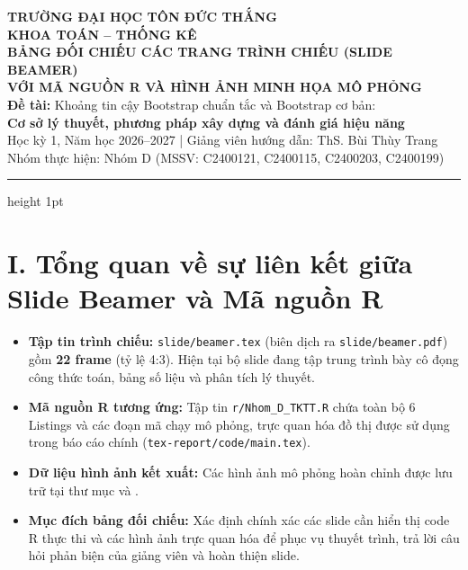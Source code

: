 \documentclass[10pt,a4paper]{article}
\begin{document}
\begin{center}
    {\large\bfseries TRƯỜNG ĐẠI HỌC TÔN ĐỨC THẮNG}\\[0.1cm]
    {\bfseries KHOA TOÁN -- THỐNG KÊ}\\[0.25cm]
    {\Large\bfseries\color{primary} BẢNG ĐỐI CHIẾU CÁC TRANG TRÌNH CHIẾU (SLIDE BEAMER)\\VỚI MÃ NGUỒN R VÀ HÌNH ẢNH MINH HỌA MÔ PHỎNG}\\[0.2cm]
    {\normalsize\textbf{Đề tài:} Khoảng tin cậy Bootstrap chuẩn tắc và Bootstrap cơ bản:}\\[0.05cm]
    {\normalsize\textbf{Cơ sở lý thuyết, phương pháp xây dựng và đánh giá hiệu năng}}\\[0.15cm]
    {\small Học kỳ 1, Năm học 2026--2027 \quad | \quad Giảng viên hướng dẫn: ThS. Bùi Thùy Trang}\\[0.05cm]
    {\small Nhóm thực hiện: Nhóm D (MSSV: C2400121, C2400115, C2400203, C2400199)}
\end{center}

\vspace{0.15cm}
\hrule height 1pt
\vspace{0.3cm}

\section*{I. Tổng quan về sự liên kết giữa Slide Beamer và Mã nguồn R}

\begin{itemize}
    \item \textbf{Tập tin trình chiếu:} \texttt{slide/beamer.tex} (biên dịch ra \texttt{slide/beamer.pdf}) gồm \textbf{22 frame} (tỷ lệ 4:3). Hiện tại bộ slide đang tập trung trình bày cô đọng công thức toán, bảng số liệu và phân tích lý thuyết.
    \item \textbf{Mã nguồn R tương ứng:} Tập tin \texttt{r/Nhom\_D\_TKTT.R} chứa toàn bộ 6 Listings và các đoạn mã chạy mô phỏng, trực quan hóa đồ thị được sử dụng trong báo cáo chính (\texttt{tex-report/code/main.tex}).
    \item \textbf{Dữ liệu hình ảnh kết xuất:} Các hình ảnh mô phỏng hoàn chỉnh được lưu trữ tại thư mục  và .
    \item \textbf{Mục đích bảng đối chiếu:} Xác định chính xác các slide cần hiển thị code R thực thi và các hình ảnh trực quan hóa để phục vụ thuyết trình, trả lời câu hỏi phản biện của giảng viên và hoàn thiện slide.
\end{itemize}
\end{document}

